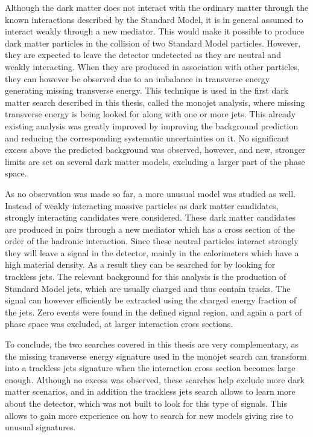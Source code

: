 Although the dark matter does not interact with the ordinary matter through the known interactions described by the Standard Model, it is in general assumed to interact weakly through a new mediator. This would make it possible to produce dark matter particles in the collision of two Standard Model particles. However, they are expected to leave the detector undetected as they are neutral and weakly interacting. When they are produced in association with other particles, they can however be observed due to an imbalance in transverse energy generating missing transverse energy. This technique is used in the first dark matter search described in this thesis, called the monojet analysis,  where missing transverse energy is being looked for along with one or more jets. This already existing analysis was greatly improved by improving the background prediction and reducing the corresponding systematic uncertainties on it. No significant excess above the predicted background was observed, however, and new, stronger limits are set on several dark matter models, excluding a larger part of the phase space.

As no observation was made so far, a more unusual model was studied as well. Instead of weakly interacting massive particles as dark matter candidates, strongly interacting candidates were considered. These dark matter candidates are produced in pairs through a new mediator which has a cross section of the order of the hadronic interaction. Since these neutral particles interact strongly they will leave a signal in the detector, mainly in the calorimeters which have a high material density. As a result they can be searched for by looking for trackless jets. The relevant background for this analysis is the production of Standard Model jets, which are usually charged and thus contain tracks. The signal can however efficiently be extracted using the charged energy fraction of the jets. Zero events were found in the defined signal region, and again a part of phase space was excluded, at larger interaction cross sections.

To conclude, the two searches covered in this thesis are very complementary, as the missing transverse energy signature used in the monojet search can transform into a trackless jets signature when the interaction cross section becomes large enough. Although no excess was observed, these searches help exclude more dark matter scenarios, and in addition the trackless jets search allows to learn more about the detector, which was not built to look for this type of signals. This allows to gain more experience on how to search for new models giving rise to unusual signatures.